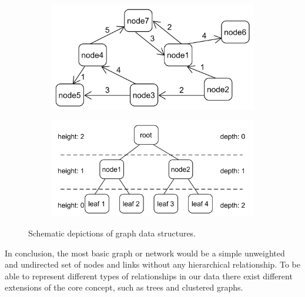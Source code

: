 \begin{figure}[h]
    \centering
    \begin{subfigure}[b]{0.45\columnwidth}
        \centering
        \includegraphics[width=\textwidth]{graphics/weightedDirectedNetwork.png}
        \label{fig:simple_weighted_directed_network}
    \end{subfigure}\hfill
    \begin{subfigure}[b]{0.54\columnwidth}
        \centering
        \includegraphics[width=\textwidth]{graphics/basicTree.png}
        \label{fig:simple_tree}
    \end{subfigure}
    
    \caption{Schematic depictions of graph data structures.} %
    \label{fig:intro} 
  \end{figure}

In conclusion, the most basic graph or network would be a simple unweighted and undirected set of nodes and links without any hierarchical relationship. To be able to represent different types of relationships in our data there exist different extensions of the core concept, such as trees and clustered graphs. 

